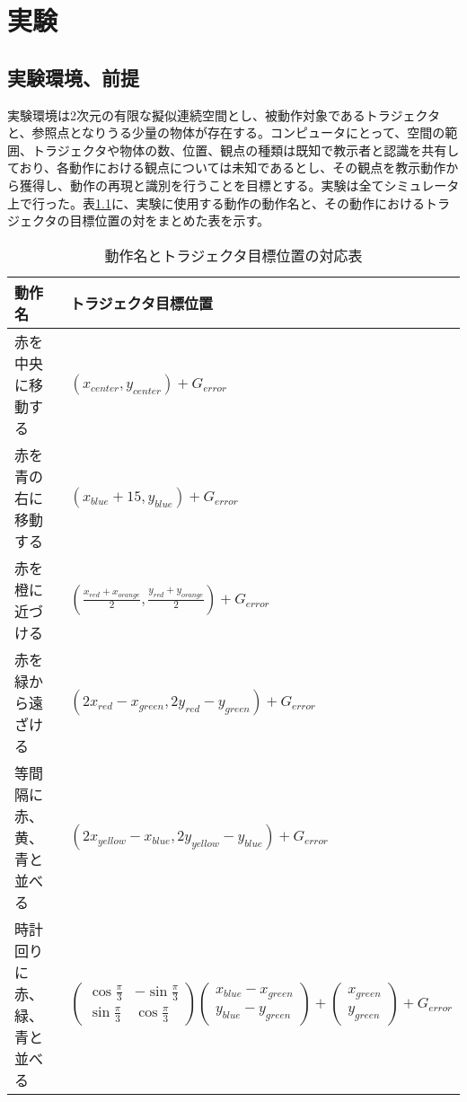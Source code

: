 ﻿%
\chapter{実験}

\section{実験環境、前提}

実験環境は2次元の有限な擬似連続空間とし、被動作対象であるトラジェクタと、参照点となりうる少量の物体が存在する。コンピュータにとって、空間の範囲、トラジェクタや物体の数、位置、観点の種類は既知で教示者と認識を共有しており、各動作における観点については未知であるとし、その観点を教示動作から獲得し、動作の再現と識別を行うことを目標とする。実験は全てシミュレータ上で行った。表\ref{table:taskname}に、実験に使用する動作の動作名と、その動作におけるトラジェクタの目標位置の対をまとめた表を示す。
\begin{table}[h]
	\caption{動作名とトラジェクタ目標位置の対応表}
	\label{table:taskname}
  	\begin{tabular}{|l|l|} \hline
    	動作名 & トラジェクタ目標位置\\ \hline
   	赤を中央に移動する & 
	$
    	\left( x_{center} , y_{center} \right)+G_{error}
    	$
    	\\
    	赤を青の右に移動する & 
	$
    	\left( x_{blue}+15 , y_{blue} \right)+G_{error}
    	$
    	\\
    	赤を橙に近づける & 
	$
    	\left( \frac{x_{red}+x_{orange}}{2} , \frac{y_{red}+y_{orange}}{2} \right)+G_{error}
    	$
    	\\
    	赤を緑から遠ざける & 
	$
    	\left( 2x_{red}-x_{green} , 2y_{red}-y_{green} \right)+G_{error}
    	$
    	\\
    	等間隔に赤、黄、青と並べる & 
	$
    	\left( 2x_{yellow}-x_{blue} , 2y_{yellow}-y_{blue} \right)+G_{error}
    	$
    	\\
    	時計回りに赤、緑、青と並べる & 
	$
	\begin{pmatrix}
        	\cos \frac{\pi}{3} & -\sin \frac{\pi}{3} \\
        	\sin \frac{\pi}{3} & \cos \frac{\pi}{3}
	\end{pmatrix}
	\begin{pmatrix}
        	x_{blue}-x_{green} \\
        	y_{blue}-y_{green}
	\end{pmatrix}
      	+
	\begin{pmatrix}
        	x_{green} \\
        	y_{green}
	\end{pmatrix}      	
	+G_{error}
    	$
    	\\ \hline
  	\end{tabular}
\end{table}

